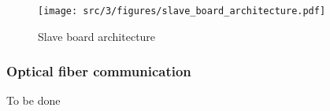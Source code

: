 \begin{figure}[!htbp]
  \centering
  \texttt{[image: src/3/figures/slave\_board\_architecture.pdf]}
  \caption{Slave board architecture}
  \label{fig:slave-board-architecture}
\end{figure}


\subsubsection{Optical fiber communication}


To be done
